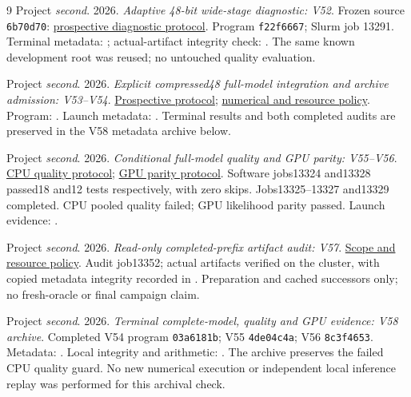 \documentclass[10pt,twocolumn,letterpaper]{article}
\begin{document}
\begin{thebibliography}{9}
Project \emph{second}. 2026. \emph{Adaptive 48-bit wide-stage diagnostic: V52}.
Frozen source \texttt{6b70d70}:
\href{https://github.com/priyankjairaj100/second/blob/6b70d703a716cef744f49ba1c55add3a691c3267/research_v52/PROTOCOL.txt}{prospective diagnostic protocol}.
Program \texttt{f22f6667}; Slurm job 13291.
Terminal metadata: ;
actual-artifact integrity check: .
The same known development root was reused; no untouched quality evaluation.

Project \emph{second}. 2026. \emph{Explicit compressed48 full-model integration and archive admission: V53--V54}.
\href{https://github.com/priyankjairaj100/second/blob/9826a95/research_v54/PROTOCOL.txt}{Prospective protocol};
\href{https://github.com/priyankjairaj100/second/blob/7f3b10d/research_v53/PROTOCOL.txt}{numerical and resource policy}.
Program: .
Launch metadata: .
Terminal results and both completed audits are preserved in the V58 metadata archive below.


Project \emph{second}. 2026. \emph{Conditional full-model quality and GPU parity: V55--V56}.
\href{https://github.com/priyankjairaj100/second/blob/792400b/research_v55/PROTOCOL.txt}{CPU quality protocol};
\href{https://github.com/priyankjairaj100/second/blob/5dcd24c/research_v56/PROTOCOL.txt}{GPU parity protocol}.
Software jobs13324 and13328 passed18 and12 tests respectively, with zero skips.
Jobs13325--13327 and13329 completed. CPU pooled quality failed; GPU likelihood parity passed.
Launch evidence: .


Project \emph{second}. 2026. \emph{Read-only completed-prefix artifact audit: V57}.
\href{https://github.com/priyankjairaj100/second/blob/a13a0c8/research_v57/README.md}{Scope and resource policy}.
Audit job13352; actual artifacts verified on the cluster, with copied metadata
integrity recorded in .
Preparation and cached successors only; no fresh-oracle or final campaign claim.

Project \emph{second}. 2026. \emph{Terminal complete-model, quality and GPU evidence: V58 archive}.
Completed V54 program \texttt{03a6181b}; V55 \texttt{4de04c4a}; V56 \texttt{8c3f4653}.
Metadata: .
Local integrity and arithmetic: .
The archive preserves the failed CPU quality guard. No new numerical execution
or independent local inference replay was performed for this archival check.


\end{thebibliography}
\end{document}
